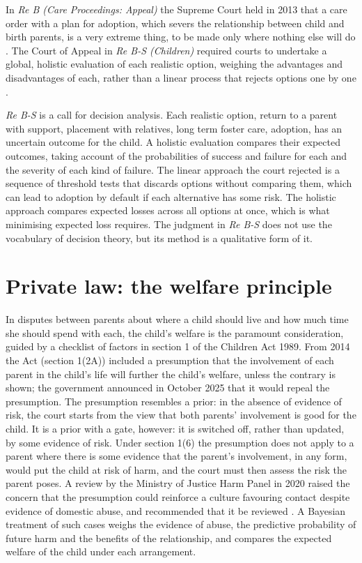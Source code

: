 In \emph{Re B (Care Proceedings: Appeal)} the Supreme Court held in 2013 that a care order with a plan for adoption, which severs the relationship between child and birth parents, is a very extreme thing, to be made only where nothing else will do \citep{reb2013}. The Court of Appeal in \emph{Re B-S (Children)} required courts to undertake a global, holistic evaluation of each realistic option, weighing the advantages and disadvantages of each, rather than a linear process that rejects options one by one \citep{rebs2013}.

\emph{Re B-S} is a call for decision analysis. Each realistic option, return to a parent with support, placement with relatives, long term foster care, adoption, has an uncertain outcome for the child. A holistic evaluation compares their expected outcomes, taking account of the probabilities of success and failure for each and the severity of each kind of failure. The linear approach the court rejected is a sequence of threshold tests that discards options without comparing them, which can lead to adoption by default if each alternative has some risk. The holistic approach compares expected losses across all options at once, which is what minimising expected loss requires. The judgment in \emph{Re B-S} does not use the vocabulary of decision theory, but its method is a qualitative form of it.

\section{Private law: the welfare principle}

In disputes between parents about where a child should live and how much time she should spend with each, the child's welfare is the paramount consideration, guided by a checklist of factors in section 1 of the Children Act 1989. From 2014 the Act (section 1(2A)) included a presumption that the involvement of each parent in the child's life will further the child's welfare, unless the contrary is shown; the government announced in October 2025 that it would repeal the presumption. The presumption resembles a prior: in the absence of evidence of risk, the court starts from the view that both parents' involvement is good for the child. It is a prior with a gate, however: it is switched off, rather than updated, by some evidence of risk. Under section 1(6) the presumption does not apply to a parent where there is some evidence that the parent's involvement, in any form, would put the child at risk of harm, and the court must then assess the risk the parent poses. A review by the Ministry of Justice Harm Panel in 2020 raised the concern that the presumption could reinforce a culture favouring contact despite evidence of domestic abuse, and recommended that it be reviewed \citep{harmpanel2020}. A Bayesian treatment of such cases weighs the evidence of abuse, the predictive probability of future harm and the benefits of the relationship, and compares the expected welfare of the child under each arrangement.

